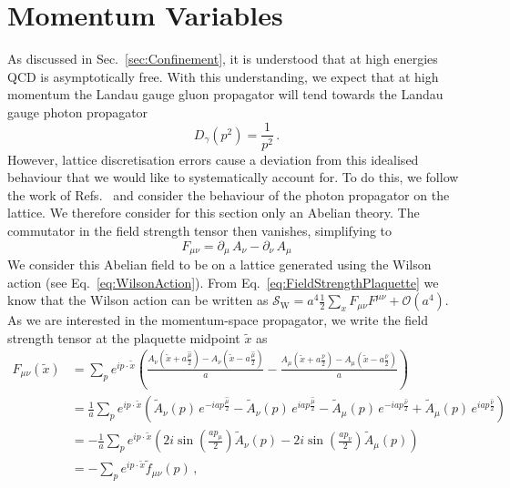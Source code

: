 \section{Momentum Variables}\label{sec:MomentumVariables}
As discussed in Sec.~\ref{sec:Confinement}, it is understood that at high energies QCD is asymptotically free. With this understanding, we expect that at high momentum the Landau gauge gluon propagator will tend towards the Landau gauge photon propagator~\cite{ryder1996quantum}
%
\begin{equation}
D_\gamma(p^2) = \frac{1}{p^2}\, .
\end{equation}
%
However, lattice discretisation errors cause a deviation from this idealised behaviour that we would like to systematically account for. To do this, we follow the work of Refs.~\cite{Weisz:1982zw, Weisz:1983bn,Luscher:1985zq,Symanzik:1983dc,Symanzik:1983gh} and consider the behaviour of the photon propagator on the lattice. We therefore consider for this section only an Abelian theory. The commutator in the field strength tensor then vanishes, simplifying to
%
\begin{equation}
F_{\mu\nu} = \partial_\mu \,A_\nu - \partial_\nu\,A_\mu
\end{equation}
%
We consider this Abelian field to be on a lattice generated using the Wilson action (see Eq.~\ref{eq:WilsonAction}). From Eq.~\ref{eq:FieldStrengthPlaquette} we know that the Wilson action can be written as $\mathcal{S}_\text{W} = a^4\frac{1}{2}\sum_x F_{\mu\nu}F^{\mu\nu} + \mathcal{O}(a^4)$. As we are interested in the momentum-space propagator, we write the field strength tensor at the plaquette midpoint $\tilde{x}$ as
%
\begin{align*}
F_{\mu\nu}(\tilde{x}) &= \sum_p e^{ip\cdot\tilde{x}} \left(\frac{A_\nu\left(\tilde{x}+a\frac{\hat{\mu}}{2}\right) - A_\nu\left(\tilde{x}-a\frac{\hat{\mu}}{2} \right)}{a} - \frac{A_\mu\left(\tilde{x}+a\frac{\hat{\nu}}{2}\right) - A_\mu\left(\tilde{x}-a\frac{\hat{\nu}}{2} \right)}{a}\right)\\
&= \frac{1}{a} \sum_p e^{ip\cdot\tilde{x}} \left(\tilde{A}_\nu(p)\, e^{-iap\frac{\hat{\mu}}{2}} - \tilde{A}_\nu(p)\, e^{iap\frac{\hat{\mu}}{2}} - \tilde{A}_\mu(p)\, e^{-iap\frac{\hat{\nu}}{2}} + \tilde{A}_\mu(p)\, e^{iap\frac{\hat{\nu}}{2}}\right)\\
&= -\frac{1}{a} \sum_p e^{ip\cdot\tilde{x}}\left(2i\sin\left(\frac{a p_\mu}{2}\right)\tilde{A}_\nu(p) - 2i\sin\left(\frac{a p_\nu}{2}\right)\tilde{A}_\mu(p)\right)\\
&= - \sum_p e^{ip\cdot\tilde{x}}\tilde{f}_{\mu\nu}(p)\, ,
\end{align*}
